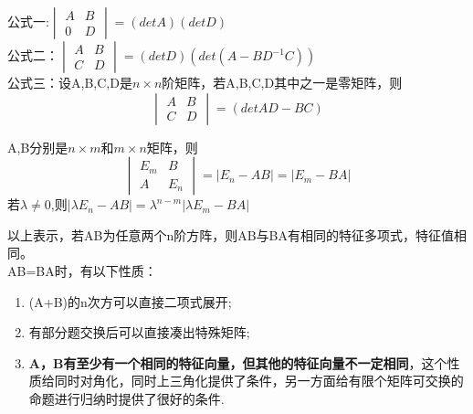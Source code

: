 \documentclass{ctexart}
\begin{document}
\noindent 公式一:$\begin{vmatrix}
    A&B \\
    0&D
  \end{vmatrix}=(detA)(detD)$\\
公式二：$\begin{vmatrix}
    A&B \\
    C&D
  \end{vmatrix}=(detD)(det(A-BD^{-1}C))$\\
公式三：设A,B,C,D是$n\times n$阶矩阵，若A,B,C,D其中之一是零矩阵，则
$$\begin{vmatrix}
    A&B \\
    C&D
  \end{vmatrix}=(detAD-BC)$$
\begin{theorem}
    A,B分别是$n \times m$和$m \times n$矩阵，则
    $$\begin{vmatrix}
        E_m&B \\
        A&E_n
      \end{vmatrix}=\left\lvert E_n-AB\right\rvert=\left\lvert E_m-BA\right\rvert  $$
      若$\lambda \neq 0$,则$\left\lvert \lambda E_n-AB\right\rvert =\lambda^{n-m}\left\lvert \lambda E_m-BA\right\rvert $
\end{theorem}
以上表示，若AB为任意两个n阶方阵，则AB与BA有相同的特征多项式，特征值相同。\\
AB=BA时，有以下性质：
\begin{enumerate} 
        \item (A+B)的n次方可以直接二项式展开; 
        \item 有部分题交换后可以直接凑出特殊矩阵;
        \item \textbf{A，B有至少有一个相同的特征向量，但其他的特征向量不一定相同}，这个性质给同时对角化，同时上三角化提供了条件，另一方面给有限个矩阵可交换的命题进行归纳时提供了很好的条件. 
    \end{enumerate}
\end{document}
